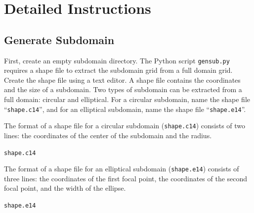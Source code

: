 \documentclass[11pt,titlepage]{article}
\begin{document}
\section{Detailed Instructions}

\subsection{Generate Subdomain}

First, create an empty subdomain directory. The Python script
\verb+gensub.py+ requires a shape file to extract the subdomain grid
from a full domain grid. Create the shape file using a text editor. A
shape file contains the coordinates and the size of a subdomain. Two
types of subdomain can be extracted from a full domain: circular and
elliptical. For a circular subdomain, name the shape file
``\verb+shape.c14+'', and for an elliptical subdomain, name the shape
file ``\verb+shape.e14+''.

\setlength\fboxsep{6pt}

The format of a shape file for a circular subdomain
(\verb+shape.c14+) consists of two lines: the coordinates of the
center of the subdomain and the radius.

\vspace{5pt}
\noindent
\mbox{}\hspace{30pt}\verb+shape.c14+\\[3pt]
\mbox{}\hspace{30pt}
\vspace{11pt}

The format of a shape file for an elliptical subdomain
(\verb+shape.e14+) consists of three lines: the coordinates of the
first focal point, the coordinates of the second focal point, and the
width of the ellipse.

\vspace{5pt}
\noindent
\mbox{}\hspace{30pt}\verb+shape.e14+\\[3pt]
\mbox{}\hspace{30pt}
\vspace{11pt}
\end{document}
